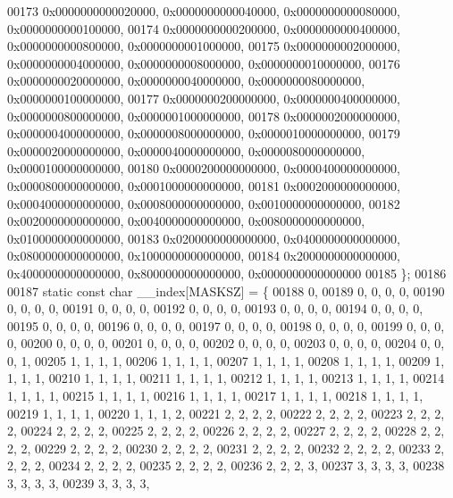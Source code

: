 \begin{DoxyCode}
00173         0x0000000000020000, 0x0000000000040000, 0x0000000000080000, 0x0000000000100000,
00174         0x0000000000200000, 0x0000000000400000, 0x0000000000800000, 0x0000000001000000,
00175         0x0000000002000000, 0x0000000004000000, 0x0000000008000000, 0x0000000010000000,
00176         0x0000000020000000, 0x0000000040000000, 0x0000000080000000, 0x0000000100000000,
00177         0x0000000200000000, 0x0000000400000000, 0x0000000800000000, 0x0000001000000000,
00178         0x0000002000000000, 0x0000004000000000, 0x0000008000000000, 0x0000010000000000,
00179         0x0000020000000000, 0x0000040000000000, 0x0000080000000000, 0x0000100000000000,
00180         0x0000200000000000, 0x0000400000000000, 0x0000800000000000, 0x0001000000000000,
00181         0x0002000000000000, 0x0004000000000000, 0x0008000000000000, 0x0010000000000000,
00182         0x0020000000000000, 0x0040000000000000, 0x0080000000000000, 0x0100000000000000,
00183         0x0200000000000000, 0x0400000000000000, 0x0800000000000000, 0x1000000000000000,
00184         0x2000000000000000, 0x4000000000000000, 0x8000000000000000, 0x0000000000000000
00185 \};
00186 
00187 \textcolor{keyword}{static} \textcolor{keyword}{const} \textcolor{keywordtype}{char} \_\_index[MASKSZ] = \{
00188         0,
00189         0, 0, 0, 0,
00190         0, 0, 0, 0,
00191         0, 0, 0, 0,
00192         0, 0, 0, 0,
00193         0, 0, 0, 0,
00194         0, 0, 0, 0,
00195         0, 0, 0, 0,
00196         0, 0, 0, 0,
00197         0, 0, 0, 0,
00198         0, 0, 0, 0,
00199         0, 0, 0, 0,
00200         0, 0, 0, 0,
00201         0, 0, 0, 0,
00202         0, 0, 0, 0,
00203         0, 0, 0, 0,
00204         0, 0, 0, 1,
00205         1, 1, 1, 1,
00206         1, 1, 1, 1,
00207         1, 1, 1, 1,
00208         1, 1, 1, 1,
00209         1, 1, 1, 1,
00210         1, 1, 1, 1,
00211         1, 1, 1, 1,
00212         1, 1, 1, 1,
00213         1, 1, 1, 1,
00214         1, 1, 1, 1,
00215         1, 1, 1, 1,
00216         1, 1, 1, 1,
00217         1, 1, 1, 1,
00218         1, 1, 1, 1,
00219         1, 1, 1, 1,
00220         1, 1, 1, 2,
00221         2, 2, 2, 2,
00222         2, 2, 2, 2,
00223         2, 2, 2, 2,
00224         2, 2, 2, 2,
00225         2, 2, 2, 2,
00226         2, 2, 2, 2,
00227         2, 2, 2, 2,
00228         2, 2, 2, 2,
00229         2, 2, 2, 2,
00230         2, 2, 2, 2,
00231         2, 2, 2, 2,
00232         2, 2, 2, 2,
00233         2, 2, 2, 2,
00234         2, 2, 2, 2,
00235         2, 2, 2, 2,
00236         2, 2, 2, 3,
00237         3, 3, 3, 3,
00238         3, 3, 3, 3,
00239         3, 3, 3, 3,

\end{DoxyCode}
